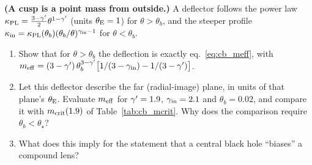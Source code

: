 \begin{exercise}
\label{ex:cb_central_excess}
\textbf{(A cusp is a point mass from outside.)}
A deflector follows the power law
$\kappa_{\rm PL}=\tfrac{3-\gamma'}{2}\theta^{1-\gamma'}$ (units $\theta_{\mathrm{E}}=1$)
for $\theta>\theta_b$, and the steeper profile
$\kappa_{\rm in}=\kappa_{\rm PL}(\theta_b)(\theta_b/\theta)^{\gamma_{\rm in}-1}$
for $\theta<\theta_b$.
\begin{enumerate}[label=(\alph*)]
  \item Show that for $\theta>\theta_b$ the deflection is exactly
        eq.~\eqref{eq:cb_meff}, with
        $m_{\rm eff}=(3-\gamma')\,\theta_b^{3-\gamma'}\big[1/(3-\gamma_{\rm in})-1/(3-\gamma')\big]$.
  \item Let this deflector describe the far (radial-image) plane, in
        units of that plane's $\theta_{\mathrm{E}}$. Evaluate $m_{\rm eff}$ for
        $\gamma'=1.9$, $\gamma_{\rm in}=2.1$ and $\theta_b=0.02$, and compare
        it with $m_{\rm crit}(1.9)$ of Table~\ref{tab:cb_mcrit}. Why
        does the comparison require $\theta_b<\theta_\star$?
  \item What does this imply for the statement that a central black hole
        ``biases'' a compound lens?
\end{enumerate}
\end{exercise}
